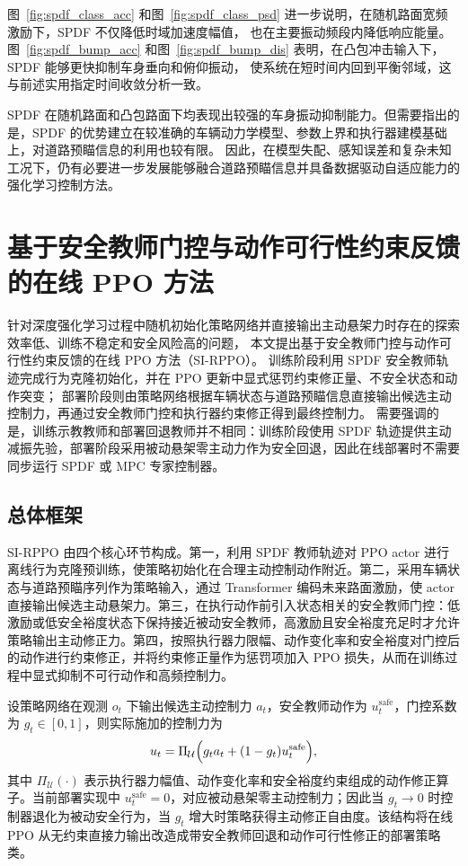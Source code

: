 图~\ref{fig:spdf_class_acc} 和图~\ref{fig:spdf_class_psd} 进一步说明，在随机路面宽频激励下，SPDF 不仅降低时域加速度幅值，
也在主要振动频段内降低响应能量。图~\ref{fig:spdf_bump_acc} 和图~\ref{fig:spdf_bump_dis} 表明，在凸包冲击输入下，SPDF 能够更快抑制车身垂向和俯仰振动，
使系统在短时间内回到平衡邻域，这与前述实用指定时间收敛分析一致。


SPDF 在随机路面和凸包路面下均表现出较强的车身振动抑制能力。但需要指出的是，SPDF 的优势建立在较准确的车辆动力学模型、参数上界和执行器建模基础上，对道路预瞄信息的利用也较有限。
因此，在模型失配、感知误差和复杂未知工况下，仍有必要进一步发展能够融合道路预瞄信息并具备数据驱动自适应能力的强化学习控制方法。


\FloatBarrier

\section{基于安全教师门控与动作可行性约束反馈的在线 PPO 方法}
\label{sec:sirppo_method}

针对深度强化学习过程中随机初始化策略网络并直接输出主动悬架力时存在的探索效率低、训练不稳定和安全风险高的问题，
本文提出基于安全教师门控与动作可行性约束反馈的在线 PPO 方法（SI-RPPO）。
训练阶段利用 SPDF 安全教师轨迹完成行为克隆初始化，并在 PPO 更新中显式惩罚约束修正量、不安全状态和动作突变；
部署阶段则由策略网络根据车辆状态与道路预瞄信息直接输出候选主动控制力，再通过安全教师门控和执行器约束修正得到最终控制力。
需要强调的是，训练示教教师和部署回退教师并不相同：训练阶段使用 SPDF 轨迹提供主动减振先验，部署阶段采用被动悬架零主动力作为安全回退，因此在线部署时不需要同步运行 SPDF 或 MPC 专家控制器。

\subsection{总体框架}
SI-RPPO 由四个核心环节构成。第一，利用 SPDF 教师轨迹对 PPO actor 进行离线行为克隆预训练，使策略初始化在合理主动控制动作附近。第二，采用车辆状态与道路预瞄序列作为策略输入，通过 Transformer 编码未来路面激励，使 actor 直接输出候选主动悬架力。第三，在执行动作前引入状态相关的安全教师门控：低激励或低安全裕度状态下保持接近被动安全教师，高激励且安全裕度充足时才允许策略输出主动修正力。第四，按照执行器力限幅、动作变化率和安全裕度对门控后的动作进行约束修正，并将约束修正量作为惩罚项加入 PPO 损失，从而在训练过程中显式抑制不可行动作和高频控制力。

设策略网络在观测 $o_t$ 下输出候选主动控制力 $a_t$，安全教师动作为 $u_t^{\mathrm{safe}}$，门控系数为 $g_t\in[0,1]$，则实际施加的控制力为
\begin{equation}
u_t=\Pi_{\mathcal U}\Bigl(g_t a_t+(1-g_t)u_t^{\mathrm{safe}}\Bigr),
\label{eq:sirppo_action}
\end{equation}
其中 $\Pi_{\mathcal U}(\cdot)$ 表示执行器力幅值、动作变化率和安全裕度约束组成的动作修正算子。当前部署实现中 $u_t^{\mathrm{safe}}=0$，对应被动悬架零主动控制力；因此当 $g_t\to0$ 时控制器退化为被动安全行为，当 $g_t$ 增大时策略获得主动修正自由度。该结构将在线 PPO 从无约束直接力输出改造成带安全教师回退和动作可行性修正的部署策略类。

